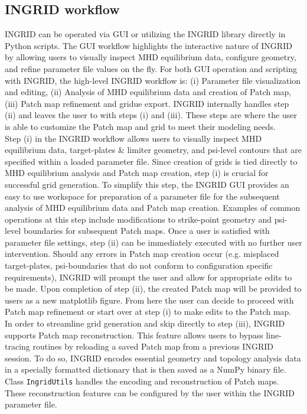 \subsection{\label{sec:level2}INGRID workflow}
INGRID can be operated via GUI or utilizing the INGRID library directly in Python scripts. The GUI workflow highlights the interactive nature of INGRID by allowing users to visually inspect MHD equilibrium data, configure geometry, and refine parameter file values on the fly. For both GUI operation and scripting with INGRID, the high-level INGRID workflow is: (i)  Parameter file visualization and editing, (ii) Analysis of MHD equilibrium data and creation of Patch map, (iii) Patch map refinement and gridue export.
\noindent
INGRID internally handles step (ii) and leaves the user to with steps (i) and (iii). These steps are where the user is able to customize the Patch map and grid to meet their modeling needs.\\ \indent
Step (i) in the INGRID workflow allows users to visually inspect MHD equilibrium data, target-plates \& limiter geometry, and psi-level contours that are specified within a loaded parameter file. Since creation of grids is tied directly to MHD equilibrium analysis and Patch map creation, step (i) is crucial for successful grid generation. To simplify this step, the INGRID GUI provides an easy to use workspace for preparation of a parameter file for the subsequent analysis of MHD equilibrium data and Patch map creation. Examples of common operations at this step include modifications to strike-point geometry and psi-level boundaries for subsequent Patch maps. Once a user is satisfied with parameter file settings, step (ii) can be immediately executed with no further user intervention. Should any errors in Patch map creation occur (e.g. misplaced target-plates, psi-boundaries that do not conform to configuration specific requirements), INGRID will prompt the user and allow for appropriate edits to be made. Upon completion of step (ii), the created Patch map will be provided to users as a new matplotlib figure. From here the user can decide to proceed with Patch map refinement or start over at step (i) to make edits to the Patch map.\\ \indent
In order to streamline grid generation and skip directly to step (iii), INGRID supports Patch map reconstruction. This feature allows users to bypass line-tracing routines by reloading a saved Patch map from a previous INGRID session. To do so, INGRID encodes essential geometry and topology analysis data in a specially formatted dictionary that is then saved as a NumPy binary file. Class \texttt{IngridUtils} handles the encoding and reconstruction of Patch maps. These reconstruction features can be configured by the user within the INGRID parameter file.\\ \indent
